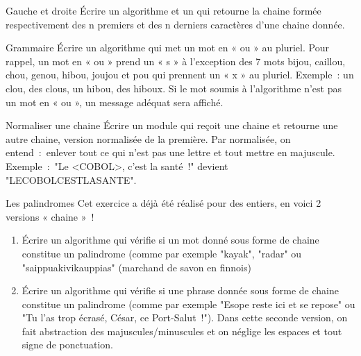 \begin{Exercice}{Gauche et droite}
	Écrire un algorithme  
	et un 
	qui retourne la chaine formée respectivement 
	des n premiers et des n derniers caractères d’une chaine donnée.	
\end{Exercice}

\begin{Exercice}{Grammaire}
	Écrire un algorithme 
	qui met un mot en « ou » au pluriel. 
	Pour rappel, 
	un mot en « ou » prend un « s » à l’exception des 7 mots 
	bijou, caillou, chou, genou, hibou, joujou et pou qui prennent 
	un « x » au pluriel. 
	Exemple~: un clou, des clous, un hibou, des hiboux. 
	Si le mot soumis à l’algorithme n’est pas un mot en « ou », 
	un message adéquat sera affiché.
\end{Exercice}

\begin{Exercice}{Normaliser une chaine}
	Écrire un module qui reçoit une chaine et retourne une autre chaine,
	version normalisée de la première.
	Par normalisée, on entend~:~enlever tout ce qui n’est pas une lettre 
	et tout mettre en majuscule.
	\\Exemple~:~"Le <COBOL>, c’est la santé~!" devient "LECOBOLCESTLASANTE".
\end{Exercice}

\begin{Exercice}{Les palindromes}
	Cet exercice a déjà été réalisé pour des entiers, 
	en voici 2 versions « chaine »~! 
	\begin{enumerate}[label=\alph*)]
		\item 
			Écrire un algorithme qui vérifie 
			si un mot donné sous forme de chaine 
			constitue un palindrome 
			(comme par exemple "kayak", "radar" ou "saippuakivikauppias" 
			(marchand de savon en finnois)
		\item
			Écrire un algorithme qui vérifie 
			si une phrase donnée sous forme de chaine constitue un palindrome 
			(comme par exemple "Esope reste ici et se repose" 
			ou "Tu l’as trop écrasé, César, ce Port-Salut~!"). 
			Dans cette seconde version, 
			on fait abstraction des majuscules/minuscules 
			et on néglige les espaces et tout signe de ponctuation.
	\end{enumerate}
\end{Exercice}


